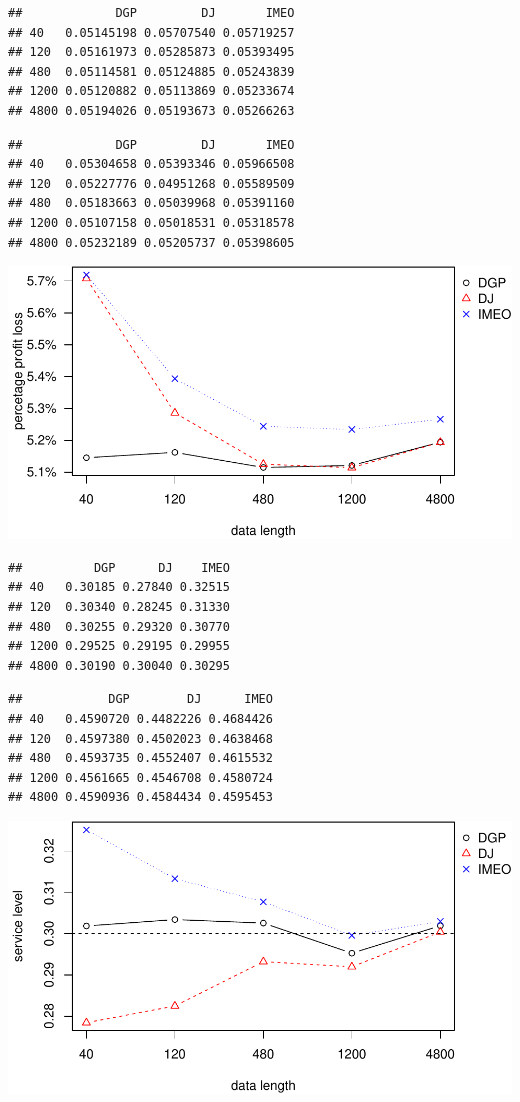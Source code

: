 \documentclass[
]{article}
\begin{document}
\begin{verbatim}
##             DGP         DJ       IMEO
## 40   0.05145198 0.05707540 0.05719257
## 120  0.05161973 0.05285873 0.05393495
## 480  0.05114581 0.05124885 0.05243839
## 1200 0.05120882 0.05113869 0.05233674
## 4800 0.05194026 0.05193673 0.05266263
\end{verbatim}

\begin{verbatim}
##             DGP         DJ       IMEO
## 40   0.05304658 0.05393346 0.05966508
## 120  0.05227776 0.04951268 0.05589509
## 480  0.05183663 0.05039968 0.05391160
## 1200 0.05107158 0.05018531 0.05318578
## 4800 0.05232189 0.05205737 0.05398605
\end{verbatim}

\includegraphics{information-plot_files/figure-latex/SAR(3)(1)_4ppl-1.pdf}

\begin{verbatim}
##          DGP      DJ    IMEO
## 40   0.30185 0.27840 0.32515
## 120  0.30340 0.28245 0.31330
## 480  0.30255 0.29320 0.30770
## 1200 0.29525 0.29195 0.29955
## 4800 0.30190 0.30040 0.30295
\end{verbatim}

\begin{verbatim}
##            DGP        DJ      IMEO
## 40   0.4590720 0.4482226 0.4684426
## 120  0.4597380 0.4502023 0.4638468
## 480  0.4593735 0.4552407 0.4615532
## 1200 0.4561665 0.4546708 0.4580724
## 4800 0.4590936 0.4584434 0.4595453
\end{verbatim}

\includegraphics{information-plot_files/figure-latex/SAR(3)(1)_4sl-1.pdf}
\end{document}
